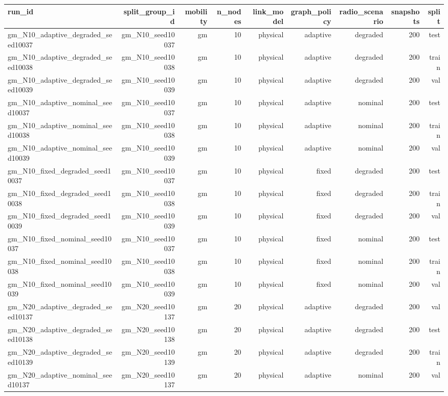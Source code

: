 \begin{tabular}{lrrrrrrrr}
\toprule
run\_id & split\_group\_id & mobility & n\_nodes & link\_model & graph\_policy & radio\_scenario & snapshots & split \\
\midrule
gm\_N10\_adaptive\_degraded\_seed10037 & gm\_N10\_seed10037 & gm & 10 & physical & adaptive & degraded & 200 & test \\
gm\_N10\_adaptive\_degraded\_seed10038 & gm\_N10\_seed10038 & gm & 10 & physical & adaptive & degraded & 200 & train \\
gm\_N10\_adaptive\_degraded\_seed10039 & gm\_N10\_seed10039 & gm & 10 & physical & adaptive & degraded & 200 & val \\
gm\_N10\_adaptive\_nominal\_seed10037 & gm\_N10\_seed10037 & gm & 10 & physical & adaptive & nominal & 200 & test \\
gm\_N10\_adaptive\_nominal\_seed10038 & gm\_N10\_seed10038 & gm & 10 & physical & adaptive & nominal & 200 & train \\
gm\_N10\_adaptive\_nominal\_seed10039 & gm\_N10\_seed10039 & gm & 10 & physical & adaptive & nominal & 200 & val \\
gm\_N10\_fixed\_degraded\_seed10037 & gm\_N10\_seed10037 & gm & 10 & physical & fixed & degraded & 200 & test \\
gm\_N10\_fixed\_degraded\_seed10038 & gm\_N10\_seed10038 & gm & 10 & physical & fixed & degraded & 200 & train \\
gm\_N10\_fixed\_degraded\_seed10039 & gm\_N10\_seed10039 & gm & 10 & physical & fixed & degraded & 200 & val \\
gm\_N10\_fixed\_nominal\_seed10037 & gm\_N10\_seed10037 & gm & 10 & physical & fixed & nominal & 200 & test \\
gm\_N10\_fixed\_nominal\_seed10038 & gm\_N10\_seed10038 & gm & 10 & physical & fixed & nominal & 200 & train \\
gm\_N10\_fixed\_nominal\_seed10039 & gm\_N10\_seed10039 & gm & 10 & physical & fixed & nominal & 200 & val \\
gm\_N20\_adaptive\_degraded\_seed10137 & gm\_N20\_seed10137 & gm & 20 & physical & adaptive & degraded & 200 & val \\
gm\_N20\_adaptive\_degraded\_seed10138 & gm\_N20\_seed10138 & gm & 20 & physical & adaptive & degraded & 200 & test \\
gm\_N20\_adaptive\_degraded\_seed10139 & gm\_N20\_seed10139 & gm & 20 & physical & adaptive & degraded & 200 & train \\
gm\_N20\_adaptive\_nominal\_seed10137 & gm\_N20\_seed10137 & gm & 20 & physical & adaptive & nominal & 200 & val \\

\end{tabular}
